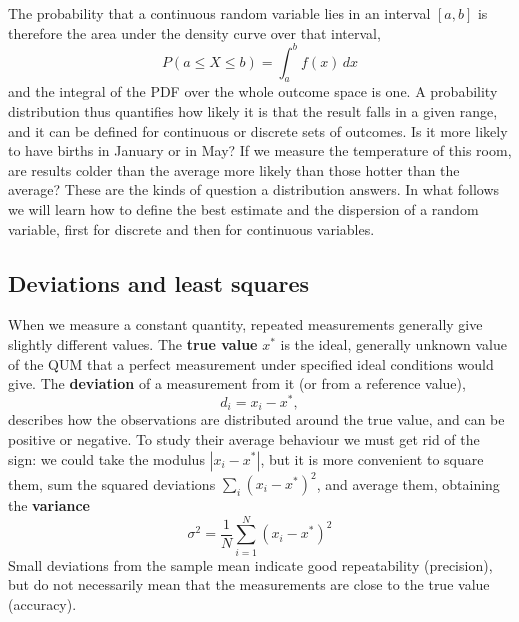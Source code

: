\documentclass[letterpaper,11pt,leqno]{book}
\begin{document}
The probability that a continuous random variable lies in an interval $[a, b]$ is therefore the area under the density curve over that interval,
\begin{equation}
\boxed{P(a \le X \le b) = \int_a^b f(x)\,dx}
\label{eq:probability_interval}
\end{equation}
and the integral of the PDF over the whole outcome space is one. A probability distribution thus quantifies how likely it is that the result falls in a given range, and it can be defined for continuous or discrete sets of outcomes. Is it more likely to have births in January or in May? If we measure the temperature of this room, are results colder than the average more likely than those hotter than the average? These are the kinds of question a distribution answers. In what follows we will learn how to define the best estimate and the dispersion of a random variable, first for discrete and then for continuous variables.

\subsection{Deviations and least squares}

When we measure a constant quantity, repeated measurements generally give slightly different values. The \textbf{true value} $x^*$ is the ideal, generally unknown value of the QUM that a perfect measurement under specified ideal conditions would give. The \textbf{deviation} of a measurement from it (or from a reference value),
\begin{equation}
d_i = x_i - x^*,
\label{eq:deviation}
\end{equation}
describes how the observations are distributed around the true value, and can be positive or negative. To study their average behaviour we must get rid of the sign: we could take the modulus $|x_i - x^*|$, but it is more convenient to square them, sum the squared deviations $\sum_i(x_i - x^*)^2$, and average them, obtaining the \textbf{variance}
\begin{equation}
\boxed{\sigma^2 = \frac{1}{N}\sum_{i=1}^{N}(x_i - x^*)^2}
\label{eq:variance_true_value}
\end{equation}
Small deviations from the sample mean indicate good repeatability (precision), but do not necessarily mean that the measurements are close to the true value (accuracy).
\end{document}

